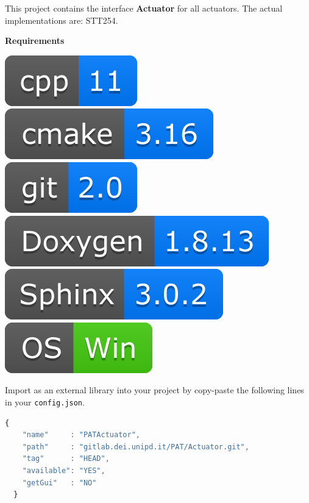 
This project contains the interface \textbf{Actuator} for all actuators. The
actual implementations are: STT254.

\textbf{Requirements}

\includegraphics[scale=0.7]{img/shilds/cpp.png}
\includegraphics[scale=0.7]{img/shilds/cmake.png}
\includegraphics[scale=0.7]{img/shilds/git.png}
\includegraphics[scale=0.7]{img/shilds/doxygen.png}
\includegraphics[scale=0.7]{img/shilds/sphinx.png}
\includegraphics[scale=0.7]{img/shilds/win.png}



Import as an external library into your project by copy-paste the
following lines in your \texttt{config.json}.

\begin{lstlisting}[language=javascript, gobble=2]
  {
    "name"     : "PATActuator",
    "path"     : "gitlab.dei.unipd.it/PAT/Actuator.git",
    "tag"      : "HEAD",
    "available": "YES",
    "getGui"   : "NO"
  }
\end{lstlisting}

